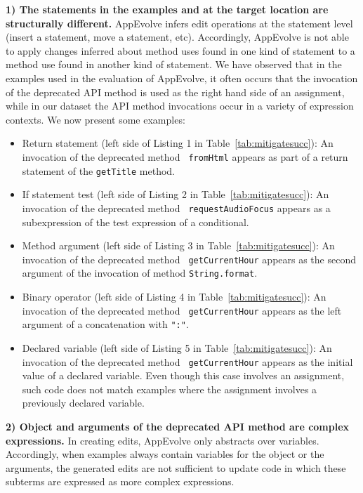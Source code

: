 \vspace{0.25\baselineskip}\noindent\textbf{1) The statements in the examples and at the target location are
 structurally different.} AppEvolve infers edit operations at the statement
 level (insert a statement, move a statement, etc).  Accordingly, AppEvolve
 is not able to apply changes inferred about method uses found in one kind
 of statement to a method use found in another kind of statement.  We have
 observed that in the examples used in the evaluation of AppEvolve, it
 often occurs that the invocation of the deprecated API method is used as
 the right hand side of an assignment, while in our dataset the API method
 invocations occur in a variety of expression contexts.  We now present
 some examples:
\begin{itemize}
\item Return statement (left side of Listing 1 in
Table~\ref{tab:mitigatesucc}): An invocation of the deprecated method {\tt
fromHtml} appears as part of a return statement of the {\tt getTitle}
method.

\item If statement test (left side of Listing 2 in
Table~\ref{tab:mitigatesucc}): An invocation of the deprecated method {\tt
request\-Audio\-Focus} appears as a subexpression of the test expression of a
conditional.

\item Method argument (left side of Listing 3 in
Table~\ref{tab:mitigatesucc}): An invocation of the deprecated method {\tt
getCurrentHour} appears as the second argument of the invocation of method
{\tt String.format}.

\item Binary operator (left side of Listing 4 in
Table~\ref{tab:mitigatesucc}): An invocation of the deprecated method {\tt
getCurrentHour} appears as the left argument of a concatenation with {\tt ":"}.

\item Declared variable (left side of Listing 5 in
Table~\ref{tab:mitigatesucc}): An invocation of the deprecated method {\tt
getCurrentHour} appears as the initial value of a declared variable.  Even
though this case involves an assignment, such code does not match examples
where the assignment involves a previously declared variable.
\end{itemize}

\vspace{0.25\baselineskip}\noindent\textbf{2) Object and arguments of the
deprecated API method are complex expressions.}
In creating edits, AppEvolve only abstracts over variables.  Accordingly,
when examples always contain variables for the object or the arguments, the
generated edits are not sufficient to update code in which these subterms
are expressed as more complex expressions.

